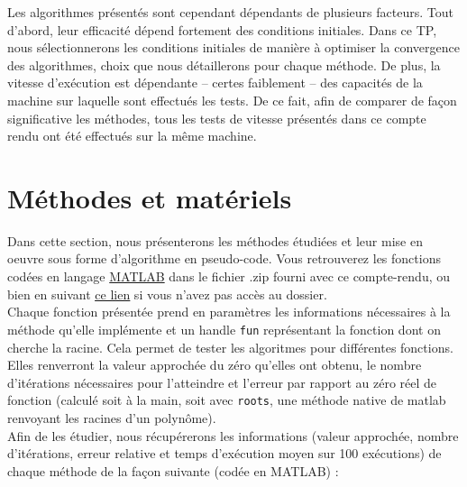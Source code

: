 \documentclass[12pt]{article}
\begin{document}
\noindent Les algorithmes présentés sont cependant dépendants de plusieurs facteurs. Tout d'abord, leur efficacité dépend fortement des conditions initiales. Dans ce TP, nous sélectionnerons les conditions initiales de manière à optimiser la convergence des algorithmes, choix que nous détaillerons pour chaque méthode. De plus, la vitesse d'exécution est dépendante – certes faiblement – des capacités de la machine sur laquelle sont effectués les tests. De ce fait, afin de comparer de façon significative les méthodes, tous les tests de vitesse présentés dans ce compte rendu ont été effectués sur la même machine.


\newpage
\section{Méthodes et matériels}
\noindent Dans cette section, nous présenterons les méthodes étudiées et leur mise en oeuvre sous forme d'algorithme en pseudo-code. Vous retrouverez les fonctions codées en langage \href{https://www.mathworks.com/products/matlab.html}{MATLAB} dans le fichier .zip fourni avec ce compte-rendu, ou bien en suivant \href{https://github.com/taupz/tp_matlab}{\underline{ce lien}} si vous n'avez pas accès au dossier.\\

\noindent Chaque fonction présentée prend en paramètres les informations nécessaires à la méthode qu'elle implémente et un handle \texttt{fun} représentant la fonction dont on cherche la racine. Cela permet de tester les algoritmes pour différentes fonctions. Elles renverront la valeur approchée du zéro qu'elles ont obtenu, le nombre d'itérations nécessaires pour l'atteindre et l'erreur par rapport au zéro réel de fonction (calculé soit à la main, soit avec \texttt{roots}, une méthode native de matlab renvoyant les racines d'un polynôme). \\
\noindent Afin de les étudier, nous récupérerons les informations (valeur approchée, nombre d'itérations, erreur relative et temps d'exécution moyen sur 100 exécutions) de chaque méthode de la façon suivante (codée en MATLAB) :\\
\end{document}
